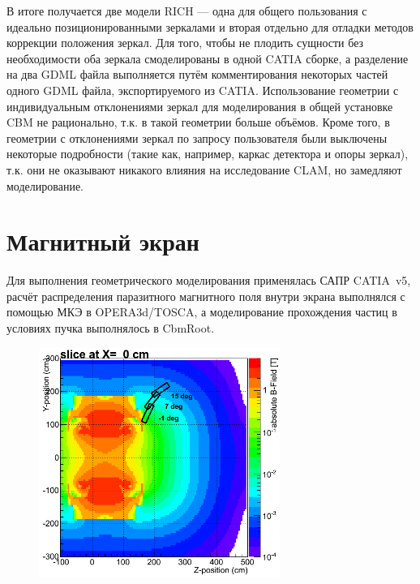 В итоге получается две модели RICH --- одна для общего пользования с идеально позиционированными зеркалами и вторая отдельно для отладки методов коррекции положения зеркал. Для того, чтобы не \todo плодить сущности без необходимости оба зеркала смоделированы в одной CATIA сборке, а разделение на два GDML файла выполняется путём комментирования некоторых частей одного GDML файла, экспортируемого из CATIA. Использование геометрии с индивидуальным отклонениями зеркал для моделирования в общей установке CBM не рационально, т.к. в такой геометрии больше объёмов. Кроме того, в геометрии с отклонениями зеркал по запросу пользователя были выключены некоторые подробности (такие как, например, каркас детектора и опоры зеркал), т.к. они не оказывают никакого влияния на исследование CLAM, но замедляют моделирование.


\section{Магнитный экран}\label{sec:secRICHmagScreen}

Для выполнения геометрического моделирования применялась САПР CATIA~v5, расчёт распределения паразитного магнитного поля внутри экрана выполнялся с помощью МКЭ в OPERA3d/TOSCA, а моделирование прохождения частиц в условиях пучка выполнялось в CbmRoot.

\begin{figure}[H]
\centering
\includegraphics[width=0.7\textwidth]{pictures/MagScreenPositions.png}
\caption{}
\label{fig:MagScreenPositions}
\end{figure}


